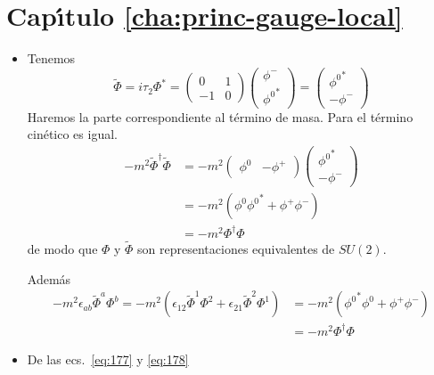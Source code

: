 \section*{Cap\'\i tulo \ref{cha:princ-gauge-local}}

\begin{itemize}
\item[\ref{cha:princ-gauge-local}.\ref{item:pch3.3}] 
Tenemos  
\begin{equation}
  \tilde\Phi=i\tau_2\Phi^*=\begin{pmatrix}
    0&  1\\
    -1& 0
  \end{pmatrix}
  \begin{pmatrix}
\phi^-\\
{\phi^0}^*    
  \end{pmatrix}=
  \begin{pmatrix}
    {\phi^0}^*\\
    -\phi^-
  \end{pmatrix}
\end{equation}
Haremos la parte correspondiente al t\'ermino de masa. Para el t\'ermino cin\'etico es igual.
\begin{align}
  -m^2\tilde\Phi^\dagger \tilde\Phi
&=-m^2
\begin{pmatrix}
  {\phi^0}&-\phi^+
\end{pmatrix}
\begin{pmatrix}
  {\phi^0}^*\\
  -\phi^-
\end{pmatrix}\nonumber\\
&=-m^2(\phi^0{\phi^0}^*+\phi^+\phi^-)\nonumber\\
&=-m^2\Phi^\dagger \Phi
\end{align}
de modo que $\Phi$ y $\tilde \Phi$ son representaciones equivalentes de $SU(2)$.

Adem\'as
  \begin{align}
   -m^2\epsilon_{ab}\tilde \Phi^a\Phi^b= -m^2(\epsilon_{12}\tilde\Phi^1\Phi^2+\epsilon_{21}\tilde\Phi^2\Phi^1)
    &=-m^2({\phi^0}^*\phi^0+\phi^+\phi^-)\nonumber\\
    &=-m^2\Phi^\dagger \Phi 
  \end{align}
\item[\ref{cha:princ-gauge-local}.\ref{item:pch3.4}] De las ecs.~\eqref{eq:177} y \eqref{eq:178}


\end{itemize}
